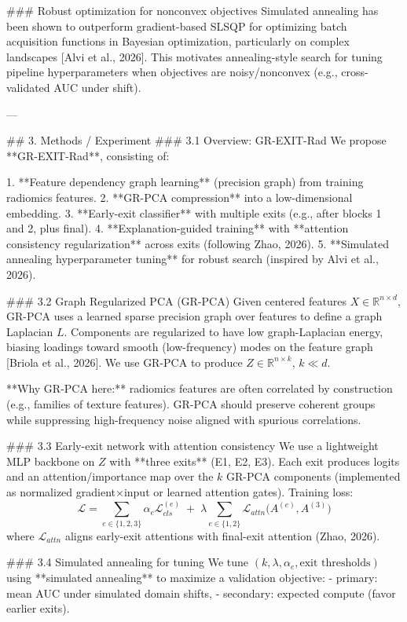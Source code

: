 ### Robust optimization for nonconvex objectives
Simulated annealing has been shown to outperform gradient-based SLSQP for optimizing batch acquisition functions in Bayesian optimization, particularly on complex landscapes [Alvi et al., 2026]. This motivates annealing-style search for tuning pipeline hyperparameters when objectives are noisy/nonconvex (e.g., cross-validated AUC under shift).

---

## 3. Methods / Experiment
### 3.1 Overview: GR-EXIT-Rad
We propose **GR-EXIT-Rad**, consisting of:

1. **Feature dependency graph learning** (precision graph) from training radiomics features.
2. **GR-PCA compression** into a low-dimensional embedding.
3. **Early-exit classifier** with multiple exits (e.g., after blocks 1 and 2, plus final).
4. **Explanation-guided training** with **attention consistency regularization** across exits (following Zhao, 2026).
5. **Simulated annealing hyperparameter tuning** for robust search (inspired by Alvi et al., 2026).

### 3.2 Graph Regularized PCA (GR-PCA)
Given centered features \(X \in \mathbb{R}^{n\times d}\), GR-PCA uses a learned sparse precision graph over features to define a graph Laplacian \(L\). Components are regularized to have low graph-Laplacian energy, biasing loadings toward smooth (low-frequency) modes on the feature graph [Briola et al., 2026]. We use GR-PCA to produce \(Z \in \mathbb{R}^{n\times k}\), \(k \ll d\).

**Why GR-PCA here:** radiomics features are often correlated by construction (e.g., families of texture features). GR-PCA should preserve coherent groups while suppressing high-frequency noise aligned with spurious correlations.

### 3.3 Early-exit network with attention consistency
We use a lightweight MLP backbone on \(Z\) with **three exits** (E1, E2, E3). Each exit produces logits and an attention/importance map over the \(k\) GR-PCA components (implemented as normalized gradient×input or learned attention gates). Training loss:
\[
\mathcal{L} = \sum_{e \in \{1,2,3\}} \alpha_e \mathcal{L}_{cls}^{(e)} \;+\; \lambda \sum_{e \in \{1,2\}} \mathcal{L}_{attn}\big(A^{(e)}, A^{(3)}\big)
\]
where \(\mathcal{L}_{attn}\) aligns early-exit attentions with final-exit attention (Zhao, 2026).

### 3.4 Simulated annealing for tuning
We tune \((k, \lambda, \alpha_e, \text{exit thresholds})\) using **simulated annealing** to maximize a validation objective:
- primary: mean AUC under simulated domain shifts,
- secondary: expected compute (favor earlier exits).

